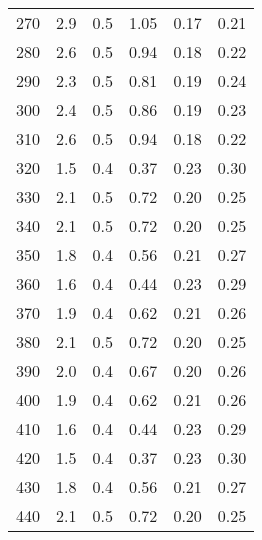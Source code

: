 \begin{tabular}{S[table-format=3.0]S[table-format=1.1]S[table-format=1.1]S[table-format=1.2]S[table-format=1.2]S[table-format=1.2]}
		270 & 2.9 & 0.5 & 1.05 & 0.17 & 0.21 \\
		280 & 2.6 & 0.5 & 0.94 & 0.18 & 0.22 \\
		290 & 2.3 & 0.5 & 0.81 & 0.19 & 0.24 \\
		300 & 2.4 & 0.5 & 0.86 & 0.19 & 0.23 \\
		310 & 2.6 & 0.5 & 0.94 & 0.18 & 0.22 \\
		320 & 1.5 & 0.4 & 0.37 & 0.23 & 0.30 \\
		330 & 2.1 & 0.5 & 0.72 & 0.20 & 0.25 \\
		340 & 2.1 & 0.5 & 0.72 & 0.20 & 0.25 \\
		350 & 1.8 & 0.4 & 0.56 & 0.21 & 0.27 \\
		360 & 1.6 & 0.4 & 0.44 & 0.23 & 0.29 \\
		370 & 1.9 & 0.4 & 0.62 & 0.21 & 0.26 \\
		380 & 2.1 & 0.5 & 0.72 & 0.20 & 0.25 \\
		390 & 2.0 & 0.4 & 0.67 & 0.20 & 0.26 \\
		400 & 1.9 & 0.4 & 0.62 & 0.21 & 0.26 \\
		410 & 1.6 & 0.4 & 0.44 & 0.23 & 0.29 \\
		420 & 1.5 & 0.4 & 0.37 & 0.23 & 0.30 \\
		430 & 1.8 & 0.4 & 0.56 & 0.21 & 0.27 \\
		440 & 2.1 & 0.5 & 0.72 & 0.20 & 0.25 \\
		\bottomrule
	\end{tabular}
